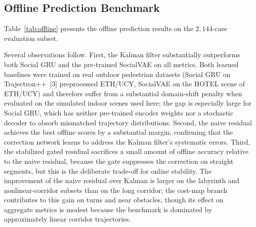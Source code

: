 \documentclass[12pt, a4paper]{article}
\begin{document}
\subsection{Offline Prediction Benchmark}
\label{sec:res-offline}

Table~\ref{tab:offline} presents the offline prediction results on the $2{,}144$-case evaluation subset.

\begin{table}[H]
\centering
\caption{Offline prediction metrics on the evaluation subset ($N=2{,}144$ trajectories, three scenes combined). ADE and FDE are measured in meters at prediction horizons $H=12$ and $H=26$; lower is better.}
\label{tab:offline}
\end{table}

Several observations follow. First, the Kalman filter substantially outperforms both Social GRU and the pre-trained SocialVAE on all metrics. Both learned baselines were trained on real outdoor pedestrian datasets (Social GRU on Trajectron++~[3] preprocessed ETH/UCY, SocialVAE on the HOTEL scene of ETH/UCY) and therefore suffer from a substantial domain-shift penalty when evaluated on the simulated indoor scenes used here; the gap is especially large for Social GRU, which has neither pre-trained encoder weights nor a stochastic decoder to absorb mismatched trajectory distributions. Second, the naive residual achieves the best offline scores by a substantial margin, confirming that the correction network learns to address the Kalman filter's systematic errors. Third, the stabilized gated residual sacrifices a small amount of offline accuracy relative to the naive residual, because the gate suppresses the correction on straight segments, but this is the deliberate trade-off for online stability. The improvement of the naive residual over Kalman is larger on the labyrinth and nonlinear-corridor subsets than on the long corridor; the cost-map branch contributes to this gain on turns and near obstacles, though its effect on aggregate metrics is modest because the benchmark is dominated by approximately linear corridor trajectories.
\end{document}
